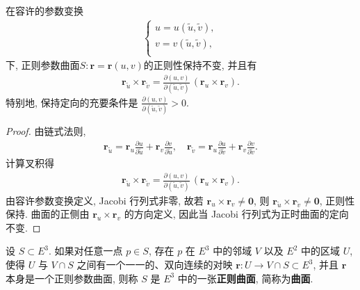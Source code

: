 \documentclass[../../main.tex]{subfiles}%
\begin{document}
\begin{theorem}
在容许的参数变换
\begin{align*}
\begin{cases}
u=u(\tilde{u},\tilde{v}),\\
v=v(\tilde{u},\tilde{v}),\\
\end{cases}
\end{align*}
下, 正则参数曲面\( S : \bm{r} = \bm{r}(u, v) \)的正则性保持不变, 并且有
\begin{align*}
\bm{r}_{\tilde{u}} \times \bm{r}_{\tilde{v}} = \frac{\partial(u, v)}{\partial(\tilde{u}, \tilde{v})}\, (\bm{r}_u \times \bm{r}_v).
\end{align*}
特别地, 保持定向的充要条件是 \( \frac{\partial(u, v)}{\partial(\tilde{u}, \tilde{v})} > 0 \).
\end{theorem}
\begin{proof}
由链式法则,
\begin{align*}
\bm{r}_{\tilde{u}} = \bm{r}_u \frac{\partial u}{\partial \tilde{u}} + \bm{r}_v \frac{\partial v}{\partial \tilde{u}},\quad
\bm{r}_{\tilde{v}} = \bm{r}_u \frac{\partial u}{\partial \tilde{v}} + \bm{r}_v \frac{\partial v}{\partial \tilde{v}}.
\end{align*}
计算叉积得
\begin{align*}
\bm{r}_{\tilde{u}} \times \bm{r}_{\tilde{v}} = \frac{\partial(u, v)}{\partial(\tilde{u}, \tilde{v})}\, (\bm{r}_u \times \bm{r}_v).
\end{align*}
由容许参数变换定义, Jacobi 行列式非零, 故若 \( \bm{r}_u \times \bm{r}_v \neq \bm{0} \), 则 \( \bm{r}_{\tilde{u}} \times \bm{r}_{\tilde{v}} \neq \bm{0} \), 正则性保持. 曲面的正侧由 \( \bm{r}_u \times \bm{r}_v \) 的方向定义, 因此当 Jacobi 行列式为正时曲面的定向不变.
\end{proof}

\begin{definition}
设 \( S \subset E^3 \). 如果对任意一点 \( p \in S \), 存在 \( p \) 在 \( E^3 \) 中的邻域 \( V \) 以及 \( E^2 \) 中的区域 \( U \), 使得 \( U \) 与 \( V \cap S \) 之间有一个一一的、双向连续的对映 \( \bm{r} : U \to V \cap S\subset E^3 \), 并且 \( \bm{r} \) 本身是一个正则参数曲面, 则称 \( S \) 是 \( E^3 \) 中的一张\textbf{正则曲面}, 简称为\textbf{曲面}.
\end{definition}
\end{document}
